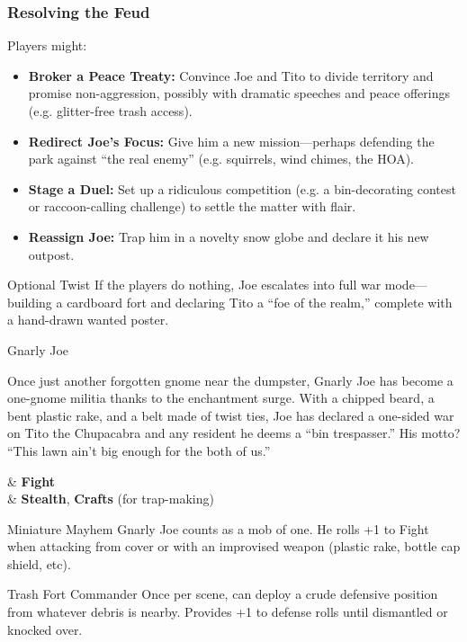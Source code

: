 \begin{multicols}{2}
\subsubsection{Resolving the Feud}
Players might:
\begin{itemize}\raggedright
    \item \textbf{Broker a Peace Treaty:} Convince Joe and Tito to divide territory and promise non-aggression, possibly with dramatic speeches and peace offerings (e.g. glitter-free trash access).
    \item \textbf{Redirect Joe’s Focus:} Give him a new mission—perhaps defending the park against “the real enemy” (e.g. squirrels, wind chimes, the HOA).
    \item \textbf{Stage a Duel:} Set up a ridiculous competition (e.g. a bin-decorating contest or raccoon-calling challenge) to settle the matter with flair.
    \item \textbf{Reassign Joe:} Trap him in a novelty snow globe and declare it his new outpost.
\end{itemize}

\begin{CommentBox}{Optional Twist}
If the players do nothing, Joe escalates into full war mode—building a cardboard fort and declaring Tito a “foe of the realm,” complete with a hand-drawn wanted poster.
\end{CommentBox}

\begin{NPC}[description={Scrappy, Tactical, Bent on Revenge}]{Gnarly Joe}

    Once just another forgotten gnome near the dumpster, Gnarly Joe has become a one-gnome militia thanks to the enchantment surge. With a chipped beard, a bent plastic rake, and a belt made of twist ties, Joe has declared a one-sided war on Tito the Chupacabra and any resident he deems a “bin trespasser.” His motto? “This lawn ain’t big enough for the both of us.”

    \vspace{0.5\baselineskip}
    \begin{SkillsBox}
        \Skilled & \textbf{Fight} \\
        \Novice  & \textbf{Stealth}, \textbf{Crafts} (for trap-making)
    \end{SkillsBox}

    \begin{TraitsBox}
        \item[Miniature Mayhem] Gnarly Joe counts as a mob of one. He rolls +1 to Fight when attacking from cover or with an improvised weapon (plastic rake, bottle cap shield, etc).
        \item[Trash Fort Commander] Once per scene, can deploy a crude defensive position from whatever debris is nearby. Provides +1 to defense rolls until dismantled or knocked over.
    \end{TraitsBox}


\end{NPC}
\end{multicols}
